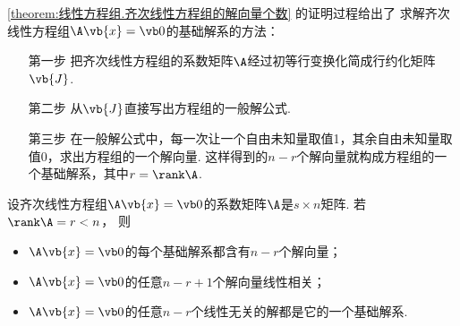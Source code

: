 \begin{remark}
\cref{theorem:线性方程组.齐次线性方程组的解向量个数} 的证明过程给出了
求解齐次线性方程组\(\A\vb{x}=\vb0\)的基础解系的方法：
\def\J{\vb{J}}
\begin{enumerate}
	\item[第一步] 把齐次线性方程组的系数矩阵\(\A\)经过初等行变换化简成行约化矩阵\(\J\).
	\item[第二步] 从\(\J\)直接写出方程组的一般解公式.
	\item[第三步] 在一般解公式中，每一次让一个自由未知量取值1，其余自由未知量取值0，求出方程组的一个解向量.
	这样得到的\(n-r\)个解向量就构成方程组的一个基础解系，其中\(r=\rank\A\).
\end{enumerate}
\end{remark}

\begin{corollary}
设齐次线性方程组\(\A\vb{x}=\vb0\)的系数矩阵\(\A\)是\(s \times n\)矩阵.
若\(\rank\A = r < n\)，
则\begin{itemize}
	\item \(\A\vb{x}=\vb0\)的每个基础解系都含有\(n-r\)个解向量；
	\item \(\A\vb{x}=\vb0\)的任意\(n-r+1\)个解向量线性相关；
	\item \(\A\vb{x}=\vb0\)的任意\(n-r\)个线性无关的解都是它的一个基础解系.
\end{itemize}
\end{corollary}

